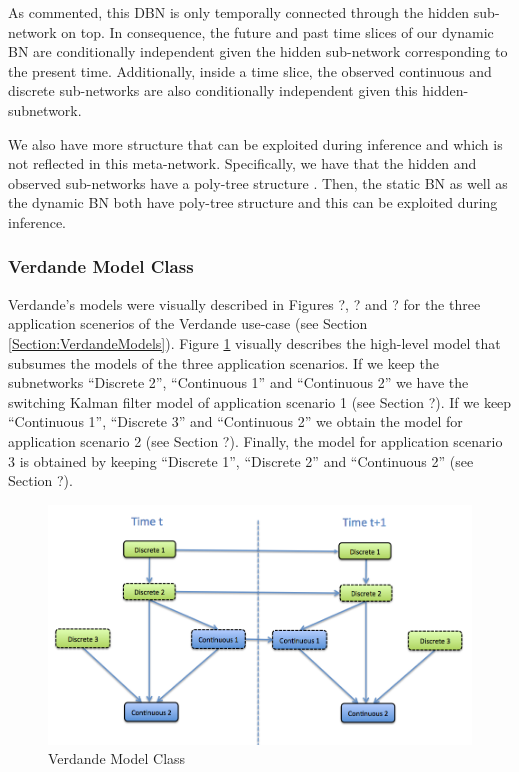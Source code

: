 As commented, this DBN is only temporally connected through the hidden sub-network on top.  In consequence, the future and past time slices of our dynamic BN are conditionally independent given the hidden sub-network corresponding to the present time. Additionally, inside a time slice, the observed continuous and discrete sub-networks are also conditionally independent given this hidden-subnetwork.

We also have more structure that can be exploited during inference and which is not reflected in this meta-network. Specifically, we have that the hidden and observed sub-networks have a poly-tree structure \cite{JensenNielsen2007}. Then, the static BN as well as the dynamic BN both have poly-tree structure and this can be exploited during inference. 

\subsubsection*{Verdande Model Class}

Verdande's models were visually described in Figures ?, ? and ? for the three application scenerios of the Verdande use-case (see Section \ref{Section:VerdandeModels}).
Figure \ref{Figure:VerdandeModelClass} visually describes the high-level model that subsumes the models
of the three application scenarios. If we keep the subnetworks ``Discrete 2'', ``Continuous 1'' and ``Continuous 2'' we have the switching Kalman filter model of application scenario 1 (see Section ?). If we keep ``Continuous 1'', ``Discrete 3'' and ``Continuous 2'' we obtain the model for application scenario 2 (see Section ?). Finally, the model for application scenario 3 is obtained by keeping ``Discrete 1'', ``Discrete 2'' and ``Continuous 2'' (see Section ?).  

\begin{figure}
\begin{center}
\includegraphics[scale=0.4]{./figures/VerdandeModelClass}
\caption{\label{Figure:VerdandeModelClass} Verdande Model Class}
\end{center}
\end{figure}

